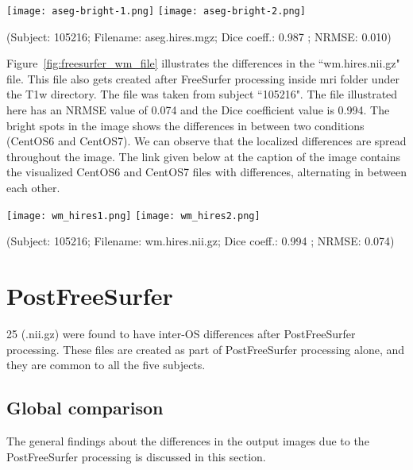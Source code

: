 \begin{center}
\texttt{[image: aseg-bright-1.png]}%
\texttt{[image: aseg-bright-2.png]}
\caption*{(Subject: 105216; Filename: aseg.hires.mgz; Dice coeff.: 0.987 ; NRMSE: 0.010)}
\label{fig:freesurfer_aseg_file}
\end{center}

Figure~\ref{fig:freesurfer_wm_file} illustrates the differences in the ``wm.hires.nii.gz" file. This file also gets created after FreeSurfer processing inside mri folder under the T1w directory. The file was taken from subject ``105216". The file illustrated here has an NRMSE value of 0.074 and the Dice coefficient value is 0.994. The bright spots in the image shows the differences in between two conditions (CentOS6 and CentOS7). We can observe that the localized differences are spread throughout the image. The link given below at the caption of the image contains the visualized CentOS6 and CentOS7 files with differences, alternating in between each other.

\begin{center}
\texttt{[image: wm\_hires1.png]}%
\texttt{[image: wm\_hires2.png]}
\caption*{(Subject: 105216; Filename: wm.hires.nii.gz; Dice coeff.: 0.994 ; NRMSE: 0.074)}
\label{fig:freesurfer_wm_file}
\end{center}

\section{PostFreeSurfer}\label{sec:Postfreesurfer}
25 (.nii.gz) were found to have inter-OS differences after PostFreeSurfer processing. These files are created as part of PostFreeSurfer processing alone, and they are common to all the five subjects.

\subsection{Global comparison}
The general findings about the differences in the output images due to the PostFreeSurfer processing is discussed in this section.


